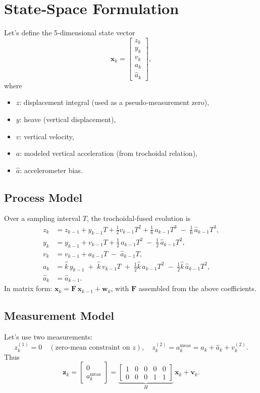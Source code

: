 \documentclass[12pt,letterpaper]{article}
\begin{document}
\section{State‐Space Formulation}
Let's define the 5‐dimensional state vector
\[
\mathbf{x}_k = 
\begin{bmatrix}
z_k \\ y_k \\ v_k \\ a_k \\ \hat a_k
\end{bmatrix},
\]
where
\begin{itemize}
  \item \(z\): displacement integral (used as a pseudo‐measurement zero),
  \item \(y\): heave (vertical displacement),
  \item \(v\): vertical velocity,
  \item \(a\): modeled vertical acceleration (from trochoidal relation),
  \item \(\hat a\): accelerometer bias.
\end{itemize}

\subsection{Process Model}
Over a sampling interval \(T\), the trochoidal‐fused evolution is
\[
\begin{aligned}
z_k &= z_{k-1} + y_{k-1}T + \tfrac12v_{k-1}T^2 + \tfrac16\,a_{k-1}T^3 \;-\;\tfrac16\,\hat a_{k-1}T^3,\\
y_k &= y_{k-1} + v_{k-1}T + \tfrac12\,a_{k-1}T^2 \;-\;\tfrac12\,\hat a_{k-1}T^2,\\
v_k &= v_{k-1} + a_{k-1}T \;-\;\hat a_{k-1}T,\\
a_k &= \hat{k}\,y_{k-1} \;+\;\hat{k}\,v_{k-1}T \;+\;\tfrac12\hat{k}\,a_{k-1}T^2 \;-\;\tfrac12\hat{k}\,\hat a_{k-1}T^2,\\
\hat a_k &= \hat a_{k-1}.
\end{aligned}
\]
In matrix form: \(\mathbf{x}_k = \mathbf{F}\,\mathbf{x}_{k-1} + \mathbf{w}_k\), with \(\mathbf{F}\) assembled from the above coefficients.

\subsection{Measurement Model}
Let's use two measurements:
\[
z^{(1)}_k = 0 \quad(\text{zero‐mean constraint on }z), 
\quad
z^{(2)}_k = a^{\mathrm{meas}}_k = a_k + \hat a_k + v^{(2)}_k.
\]
Thus
\[
\mathbf{z}_k = 
\begin{bmatrix}0 \\ a^{\mathrm{meas}}_k\end{bmatrix}
= 
\underbrace{\begin{bmatrix}1&0&0&0&0\\0&0&0&1&1\end{bmatrix}}_{\!H\!}
\,\mathbf{x}_k + \mathbf{v}_k.
\]
\end{document}
